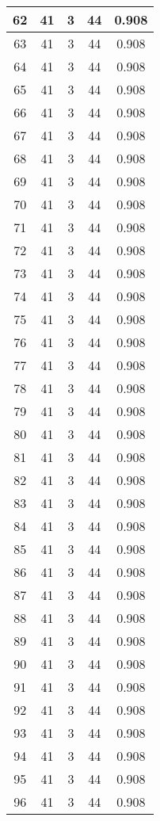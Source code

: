 \documentclass[letterpaper, 12pt]{article}
\begin{document}
\begin{longtable}{|c|c|c|c|c|}
\hline
62 & 41 & 3 & 44 & 0.908 \\
\hline
63 & 41 & 3 & 44 & 0.908 \\
\hline
64 & 41 & 3 & 44 & 0.908 \\
\hline
65 & 41 & 3 & 44 & 0.908 \\
\hline
66 & 41 & 3 & 44 & 0.908 \\
\hline
67 & 41 & 3 & 44 & 0.908 \\
\hline
68 & 41 & 3 & 44 & 0.908 \\
\hline
69 & 41 & 3 & 44 & 0.908 \\
\hline
70 & 41 & 3 & 44 & 0.908 \\
\hline
71 & 41 & 3 & 44 & 0.908 \\
\hline
72 & 41 & 3 & 44 & 0.908 \\
\hline
73 & 41 & 3 & 44 & 0.908 \\
\hline
74 & 41 & 3 & 44 & 0.908 \\
\hline
75 & 41 & 3 & 44 & 0.908 \\
\hline
76 & 41 & 3 & 44 & 0.908 \\
\hline
77 & 41 & 3 & 44 & 0.908 \\
\hline
78 & 41 & 3 & 44 & 0.908 \\
\hline
79 & 41 & 3 & 44 & 0.908 \\
\hline
80 & 41 & 3 & 44 & 0.908 \\
\hline
81 & 41 & 3 & 44 & 0.908 \\
\hline
82 & 41 & 3 & 44 & 0.908 \\
\hline
83 & 41 & 3 & 44 & 0.908 \\
\hline
84 & 41 & 3 & 44 & 0.908 \\
\hline
85 & 41 & 3 & 44 & 0.908 \\
\hline
86 & 41 & 3 & 44 & 0.908 \\
\hline
87 & 41 & 3 & 44 & 0.908 \\
\hline
88 & 41 & 3 & 44 & 0.908 \\
\hline
89 & 41 & 3 & 44 & 0.908 \\
\hline
90 & 41 & 3 & 44 & 0.908 \\
\hline
91 & 41 & 3 & 44 & 0.908 \\
\hline
92 & 41 & 3 & 44 & 0.908 \\
\hline
93 & 41 & 3 & 44 & 0.908 \\
\hline
94 & 41 & 3 & 44 & 0.908 \\
\hline
95 & 41 & 3 & 44 & 0.908 \\
\hline
96 & 41 & 3 & 44 & 0.908 \\

\end{longtable}
\end{document}
